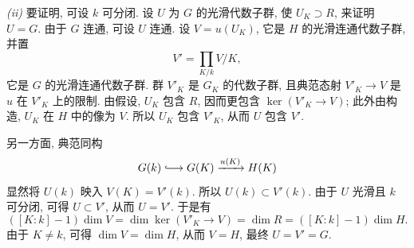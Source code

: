 \smallskip
\noindent\textit{(ii)}
要证明, 可设 \(k\) 可分闭.
设 \(U\) 为 \(G\) 的光滑代数子群, 使 \(U_K\supset R\), 来证明 \(U=G\).
由于 \(G\) 连通, 可设 \(U\) 连通.
设 \(V=u(U_K)\), 它是 \(H\) 的光滑连通代数子群, 并置
\[
  V'=\prod_{K/k}V/K,
\]
它是 \(G\) 的光滑连通代数子群.
群 \(V'_K\) 是 \(G_K\) 的代数子群,
且典范态射 \(V'_K\to V\) 是 \(u\) 在 \(V'_K\) 上的限制.
由假设, \(U_K\) 包含 \(R\), 因而更包含 \(\ker(V'_K\to V)\);
此外由构造, \(U_K\) 在 \(H\) 中的像为 \(V\).
所以 \(U_K\) 包含 \(V'_K\), 从而 \(U\) 包含 \(V'\).

另一方面, 典范同构
\[
  G(k)\lhook\joinrel\longrightarrow G(K)
    \xrightarrow{u(K)}H(K)
\]
显然将 \(U(k)\) 映入 \(V(K)=V'(k)\). 所以 \(U(k)\subset V'(k)\).
由于 \(U\) 光滑且 \(k\) 可分闭, 可得 \(U\subset V'\), 从而 \(U=V'\).
于是有
\[
  ([K:k]-1)\dim V
  =\dim\ker(V'_K\to V)
  =\dim R
  =([K:k]-1)\dim H.
\]
由于 \(K\ne k\), 可得 \(\dim V=\dim H\), 从而 \(V=H\), 最终 \(U=V'=G\).
